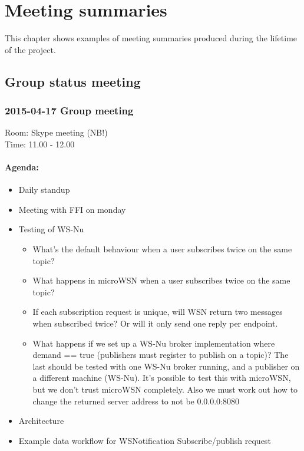 \chapter{Meeting summaries}
\label{appendix-developer-manual}

This chapter shows examples of meeting summaries produced during the lifetime of the project. 

\section{Group status meeting}

\subsection*{2015-04-17 Group meeting}
Room: Skype meeting (NB!) \\
\noindent Time: 11.00 - 12.00

\subsubsection*{Agenda:}
\begin{itemize}
\setlength{\itemsep}{0cm}%
\item Daily standup
\item Meeting with FFI on monday
\item Testing of WS-Nu \begin{itemize}
\setlength{\itemsep}{0cm}%
\item What’s the default behaviour when a user subscribes twice on the same topic?
\item What happens in microWSN when a user subscribes twice on the same topic?
\item If each subscription request is unique, will WSN return two messages when subscribed twice? Or will it only send one reply per endpoint. 
\item What happens if we set up a WS-Nu broker implementation where demand == true (publishers must register to publish on a topic)? The last should be tested with one WS-Nu broker running, and a publisher on a different machine (WS-Nu). It’s possible to test this with microWSN, but we don’t trust microWSN completely. Also we must work out how to change the returned server address to not be 0.0.0.0:8080 
\end{itemize}
\item Architecture 
\item Example data workflow for WSNotification Subscribe/publish request
\end{itemize}

